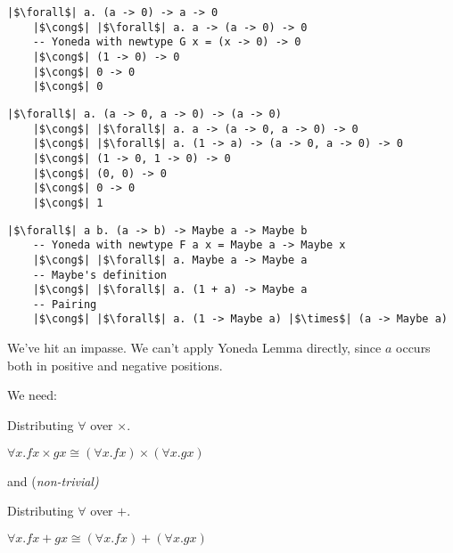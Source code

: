 \documentclass[tikz]{beamer}
\theoremstyle{definition}
\begin{document}
\begin{frame}[fragile]
\begin{verbatim}
|$\forall$| a. (a -> 0) -> a -> 0
    |$\cong$| |$\forall$| a. a -> (a -> 0) -> 0
    -- Yoneda with newtype G x = (x -> 0) -> 0
    |$\cong$| (1 -> 0) -> 0
    |$\cong$| 0 -> 0
    |$\cong$| 0
\end{verbatim}
\end{frame}

\begin{frame}[fragile]
\begin{verbatim}
|$\forall$| a. (a -> 0, a -> 0) -> (a -> 0)
    |$\cong$| |$\forall$| a. a -> (a -> 0, a -> 0) -> 0
    |$\cong$| |$\forall$| a. (1 -> a) -> (a -> 0, a -> 0) -> 0
    |$\cong$| (1 -> 0, 1 -> 0) -> 0
    |$\cong$| (0, 0) -> 0
    |$\cong$| 0 -> 0
    |$\cong$| 1
\end{verbatim}
\end{frame}


\begin{frame}[fragile]
\begin{verbatim}
|$\forall$| a b. (a -> b) -> Maybe a -> Maybe b
    -- Yoneda with newtype F a x = Maybe a -> Maybe x
    |$\cong$| |$\forall$| a. Maybe a -> Maybe a
    -- Maybe's definition
    |$\cong$| |$\forall$| a. (1 + a) -> Maybe a
    -- Pairing
    |$\cong$| |$\forall$| a. (1 -> Maybe a) |$\times$| (a -> Maybe a)
\end{verbatim}

We've hit an impasse. We can't apply Yoneda Lemma directly, since $a$ occurs both in positive and negative positions.
\end{frame}

\begin{frame}[fragile]
We need:
\begin{block}{Distributing $\forall$ over $\times$.}
    \begin{center}
        $\forall x. f x \times g x \cong (\forall x. f x) \times (\forall x. g x)$
    \end{center}
\end{block}
and (\em non-trivial)
\begin{block}{Distributing $\forall$ over $+$.}
    \begin{center}
        $\forall x. f x + g x \cong (\forall x. f x) + (\forall x. g x)$
    \end{center}
\end{block}
\end{frame}
\end{document}
